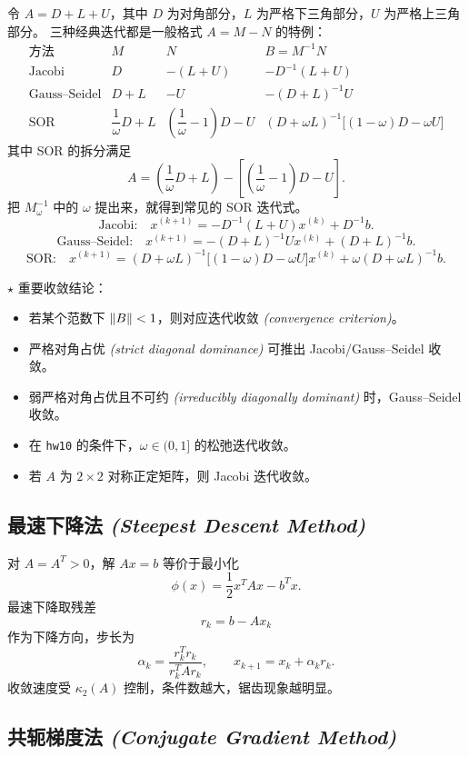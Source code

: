 \documentclass{article}
\newcommand{\keypoint}{\textcolor{red!65!black}{\textbf{$\star$}}}
\newcommand{\eng}[1]{\texorpdfstring{{\normalfont\rmfamily\itshape\textcolor{blue!65!black}{(#1)}}}{(#1)}}
\begin{document}
令 $A=D+L+U$，其中 $D$ 为对角部分，$L$ 为严格下三角部分，$U$ 为严格上三角部分。
三种经典迭代都是一般格式 $A=M-N$ 的特例：
\[
\begin{array}{c|c|c|c}
  \text{方法} & M & N & B=M^{-1}N\\
  \hline
  \text{Jacobi} & D & -(L+U) & -D^{-1}(L+U)\\
  \text{Gauss--Seidel} & D+L & -U & -(D+L)^{-1}U\\
  \text{SOR} &
  \dfrac1\omega D+L &
  \left(\dfrac1\omega-1\right)D-U &
  (D+\omega L)^{-1}\bigl[(1-\omega)D-\omega U\bigr]
\end{array}
\]
其中 SOR 的拆分满足
\[
  A=\left(\frac1\omega D+L\right)
  -\left[\left(\frac1\omega-1\right)D-U\right].
\]
把 $M_\omega^{-1}$ 中的 $\omega$ 提出来，就得到常见的 SOR 迭代式。
\[
  \text{Jacobi:}\quad
  x^{(k+1)}=-D^{-1}(L+U)x^{(k)}+D^{-1}b.
\]
\[
  \text{Gauss--Seidel:}\quad
  x^{(k+1)}=-(D+L)^{-1}Ux^{(k)}+(D+L)^{-1}b.
\]
\[
  \text{SOR:}\quad
  x^{(k+1)}=(D+\omega L)^{-1}\bigl[(1-\omega)D-\omega U\bigr]x^{(k)}
  +\omega(D+\omega L)^{-1}b.
\]

\keypoint{} 重要收敛结论：
\begin{itemize}
  \item 若某个范数下 $\left\| B \right\|<1$，则对应迭代收敛 \eng{convergence criterion}。
  \item 严格对角占优 \eng{strict diagonal dominance} 可推出 Jacobi/Gauss--Seidel 收敛。
  \item 弱严格对角占优且不可约 \eng{irreducibly diagonally dominant} 时，Gauss--Seidel 收敛。
  \item 在 \texttt{hw10} 的条件下，$\omega\in(0,1]$ 的松弛迭代收敛。
  \item 若 $A$ 为 $2\times2$ 对称正定矩阵，则 Jacobi 迭代收敛。
\end{itemize}

\subsection{最速下降法 \eng{Steepest Descent Method}}

对 $A=A^T>0$，解 $Ax=b$ 等价于最小化
\[
  \phi(x)=\frac12x^TAx-b^Tx.
\]
最速下降取残差
\[
  r_k=b-Ax_k
\]
作为下降方向，步长为
\[
  \alpha_k=\frac{r_k^Tr_k}{r_k^TAr_k},
\qquad
  x_{k+1}=x_k+\alpha_kr_k.
\]
收敛速度受 $\kappa_2(A)$ 控制，条件数越大，锯齿现象越明显。

\subsection{共轭梯度法 \eng{Conjugate Gradient Method}}
\end{document}
